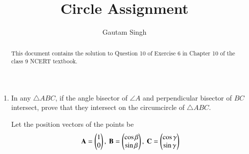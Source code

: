 \documentclass[journal,12pt,twocolumn]{IEEEtran}
\renewcommand{\vec}[1]{\boldsymbol{\mathbf{#1}}}
\begin{document}
\vspace{3cm}
\title{Circle Assignment}
\author{Gautam Singh}
\maketitle
\bigskip

\begin{abstract}
    This document contains the solution to Question 10 of 
    Exercise 6 in Chapter 10 of the class 9 NCERT textbook.
\end{abstract}

\begin{enumerate}
    \item In any $\triangle ABC$, if the angle bisector of $\angle A$ and 
    perpendicular bisector of $BC$ intersect, prove that they intersect on 
    the circumcircle of $\triangle ABC$.

    \solution Let the position vectors of the points be
    \begin{align}
        \vec{A} = \myvec{1\\0},\ \vec{B} = \myvec{\cos\beta\\\sin\beta},\ \vec{C} = \myvec{\cos\gamma\\\sin\gamma}
        \label{eq:pts}
    \end{align}


\end{enumerate}
\end{document}
